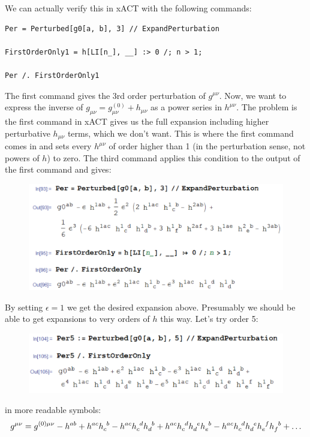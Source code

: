 \documentclass{book}
\theoremstyle{definition}
\begin{document}
We can actually verify this in xACT with the following commands:
\begin{lstlisting}
Per = Perturbed[g0[a, b], 3] // ExpandPerturbation

FirstOrderOnly1 = h[LI[n_], __] :> 0 /; n > 1;

Per /. FirstOrderOnly1
\end{lstlisting}
The first command gives the 3rd order perturbation of $g^{\mu\nu}$. Now, we want to express the inverse of $g_{\mu\nu} = g^{(0)}_{\mu\nu} + h_{\mu\nu}$ as a power series in $h^{\mu\nu}$. The problem is the first command in xACT gives us the full expansion including higher perturbative $h_{\mu\nu}$ terms, which we don't want. This is where the first command comes in and sets every $h^{\mu\nu}$ of order higher than 1 (in the perturbation sense, not powers of $h$) to zero. The third command applies this condition to the output of the first command and gives:
\begin{figure}[!htb]
	\centering
	\includegraphics[scale=0.25]{first-order}
\end{figure}



By setting $\epsilon = 1$ we get the desired expansion above. Presumably we should be able to get expansions to very orders of $h$ this way. Let's try order 5:
\begin{figure}[!htb]
	\centering
	\includegraphics[scale=0.25]{order5}
\end{figure}

in more readable symbols:
\begin{align}
g^{\mu\nu} = g^{(0)\mu\nu} -h^{ab} + h^{ac}\tensor{h}{_c^b} - h^{ac}\tensor{h}{_c^d}\tensor{h}{_d^b} + h^{ac}\tensor{h}{_c^d}\tensor{h}{_d^e}\tensor{h}{_e^b} - h^{ac}\tensor{h}{_c^d}\tensor{h}{_d^e}\tensor{h}{_e^f}\tensor{h}{_f^b} + \dots
\end{align}
\end{document}
